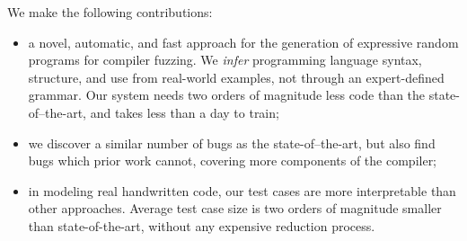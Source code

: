 %
%

We make the following contributions:
%
\begin{itemize}
\item a novel, automatic, and fast approach for the generation of expressive random programs for compiler fuzzing. We \emph{infer} programming language syntax, structure, and use from real-world examples, not through an expert-defined grammar. Our system needs two orders of magnitude less code than the state-of–the-art, and takes less than a day to train; %

\item we discover a similar number of bugs as the state-of–the-art, but also find bugs which prior work cannot, covering more components of the compiler;

\item in modeling real handwritten code, our test cases are more interpretable than other approaches. Average test case size is two orders of magnitude smaller than state-of-the-art, without any expensive reduction process.
\end{itemize}
